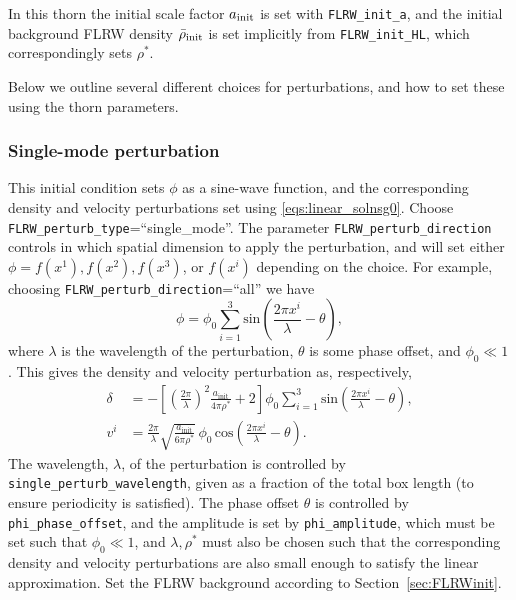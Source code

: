 In this thorn the initial scale factor $a_{\rm init}$ is set with \texttt{FLRW\_init\_a}, and the initial background FLRW density $\bar{\rho}_{\rm init}$ is set implicitly from \texttt{FLRW\_init\_HL}, which correspondingly sets $\rho^*$.

Below we outline several different choices for perturbations, and how to set these using the thorn parameters.

\subsubsection{Single-mode perturbation}\label{sec:singlemode_ics}

This initial condition sets $\phi$ as a sine-wave function, and the corresponding density and velocity perturbations set using \eqref{eqs:linear_solnsg0}. Choose \texttt{FLRW\_perturb\_type}=``single\_mode''. The parameter \texttt{FLRW\_perturb\_direction} controls in which spatial dimension to apply the perturbation, and will set either $\phi=f(x^1),f(x^2),f(x^3)$, or $f(x^i)$ depending on the choice. For example, choosing \texttt{FLRW\_perturb\_direction}=``all'' we have
\begin{equation}\label{eq:phi}
	\phi = \phi_{0} \sum_{i=1}^{3} \mathrm{sin}\left(\frac{2\pi x^{i}}{\lambda} - \theta \right),
\end{equation}
where $\lambda$ is the wavelength of the perturbation, $\theta$ is some phase offset, and $\phi_0\ll1$. This gives the density and velocity perturbation as, respectively, \cite{macpherson2017}
\begin{align} 
	\delta &= - \left[ \left(\frac{2\pi}{\lambda}\right)^{2} \frac{a_{\mathrm{init}}}{4\pi\rho^{*}} + 2\right] \phi_{0} \sum_{i=1}^{3} \mathrm{sin}\left(\frac{2\pi x^{i}}{\lambda} - \theta \right),\label{eq:initial_delta}\\
	v^{i} &= \frac{2\pi}{\lambda}\sqrt{\frac{a_{\mathrm{init}}}{6\pi\rho^{*}}}\, \phi_{0}\, \mathrm{cos}\left(\frac{2\pi x^{i}}{\lambda} - \theta \right). \label{eq:initial_deltav}
\end{align}
The wavelength, $\lambda$, of the perturbation is controlled by \texttt{single\_perturb\_wavelength}, given as a fraction of the total box length (to ensure periodicity is satisfied). The phase offset $\theta$ is controlled by {\tt phi\_phase\_offset}, and the amplitude is set by \texttt{phi\_amplitude}, which must be set such that $\phi_0\ll1$, and $\lambda, \rho^*$ must also be chosen such that the corresponding density and velocity perturbations are also small enough to satisfy the linear approximation. Set the FLRW background according to Section~\ref{sec:FLRWinit}.

